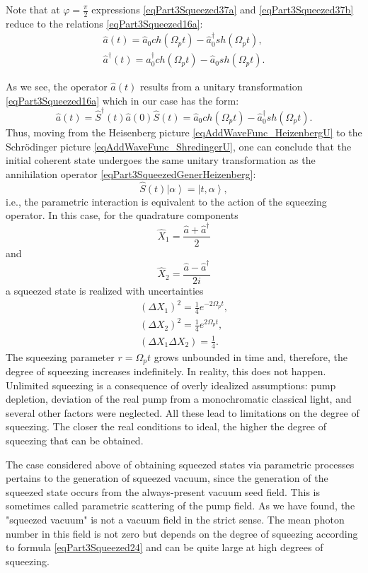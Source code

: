 Note that at $\varphi = \frac{\pi}{2}$ expressions
\eqref{eqPart3Squeezed37a} and \eqref{eqPart3Squeezed37b} reduce to
the relations
\eqref{eqPart3Squeezed16a}:
\begin{eqnarray}
\hat{a}\left(t\right) = \hat{a}_0 ch \left(\Omega_p t \right) - 
\hat{a}^{\dag}_0 sh \left(\Omega_p t\right),
\nonumber \\
\hat{a}^{\dag}\left(t\right) = \hat{a}^{\dag}_0 ch \left(\Omega_p t \right) -
\hat{a}_0 sh \left(\Omega_p t\right).
\nonumber
\end{eqnarray}

As we see, the operator $\hat{a}\left(t\right)$ results from a unitary
transformation \eqref{eqPart3Squeezed16a} which in our case
has the form:
\begin{equation}
\hat{a}\left(t\right) =
\hat{S}^{\dag}\left(t\right)
\hat{a}\left(0\right)
\hat{S}\left(t\right) =
\hat{a}_0 ch \left(\Omega_p t \right) - 
\hat{a}^{\dag}_0 sh \left(\Omega_p t\right).
\label{eqPart3SqueezedGenerHeizenberg}
\end{equation}
Thus, moving from the Heisenberg picture
\eqref{eqAddWaveFunc_HeizenbergU}
to the Schrödinger picture \eqref{eqAddWaveFunc_ShredingerU}, one can
conclude that the initial coherent state undergoes the same
unitary transformation as the annihilation
operator \eqref{eqPart3SqueezedGenerHeizenberg}:
\begin{equation}
\hat{S}\left(t\right)
\left|\alpha\right> =
\left|t, \alpha\right>,
\nonumber
\end{equation}
i.e., the parametric interaction is equivalent to the action of the squeezing operator. In this case,
for the quadrature components
\[
\hat{X}_1 = \frac{\hat{a} + \hat{a}^{\dag}}{2}
\]
and
\[
\hat{X}_2 = \frac{\hat{a} - \hat{a}^{\dag}}{2i}
\]
a squeezed state is realized with uncertainties
\begin{eqnarray}
\left(\Delta X_1\right)^2 = 
\frac{1}{4}e^{-2 \Omega_p t},
\nonumber \\
\left(\Delta X_2\right)^2 = 
\frac{1}{4}e^{2 \Omega_p t},
\nonumber \\
\left(\Delta X_1 \Delta X_2\right) = 
\frac{1}{4}.
\nonumber
\end{eqnarray}
The squeezing parameter $r = \Omega_p t$ grows unbounded in time and,
therefore, the degree of squeezing increases indefinitely. In
reality, this does not happen. Unlimited squeezing is a consequence
of overly idealized assumptions: pump depletion, deviation of the real pump from
a monochromatic classical light, and several other factors were neglected. All these lead to limitations on the degree
of squeezing. The closer the real conditions to ideal, the higher the degree
of squeezing that can be obtained.

The case considered above of obtaining squeezed states via
parametric processes pertains to the generation of squeezed vacuum,
since the generation of the squeezed state occurs from the always-present
vacuum seed field. This is sometimes called parametric
scattering of the pump field. As we have found, the "squeezed vacuum" is not
a vacuum field in the strict sense. The mean photon number in this field is not
zero but depends on the degree of squeezing according to
formula \eqref{eqPart3Squeezed24} and can be quite large at
high degrees of squeezing.
